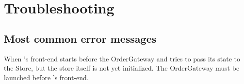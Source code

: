 \section{Troubleshooting}

\subsection{Most common error messages}

When \DemoName's front-end starts before the OrderGateway and tries to pass its state to the Store, but the store itself is not yet initialized.
The OrderGateway must be launched before \DemoName's front-end.
